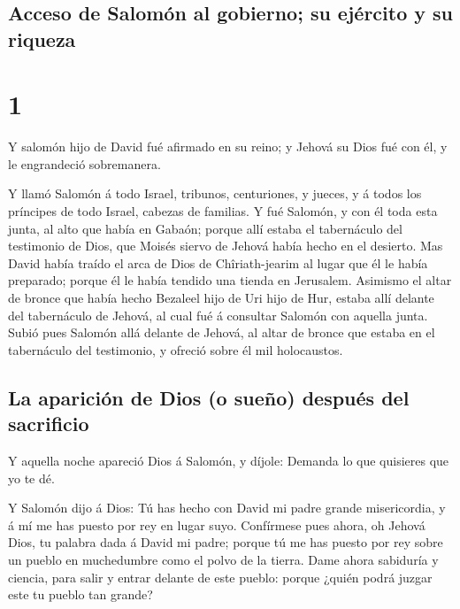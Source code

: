 \hypertarget{acceso-de-salomuxf3n-al-gobierno-su-ejuxe9rcito-y-su-riqueza}{%
\subsection{Acceso de Salomón al gobierno; su ejército y su
riqueza}\label{acceso-de-salomuxf3n-al-gobierno-su-ejuxe9rcito-y-su-riqueza}}

\hypertarget{section}{%
\section{1}\label{section}}

 Y salomón hijo de David fué afirmado en su reino; y Jehová
su Dios fué con él, y le engrandeció sobremanera.

 Y llamó Salomón á todo Israel, tribunos, centuriones, y
jueces, y á todos los príncipes de todo Israel, cabezas de familias.
 Y fué Salomón, y con él toda esta junta, al alto que había
en Gabaón; porque allí estaba el tabernáculo del testimonio de Dios, que
Moisés siervo de Jehová había hecho en el desierto.  Mas
David había traído el arca de Dios de Chîriath-jearim al lugar que él le
había preparado; porque él le había tendido una tienda en Jerusalem.
 Asimismo el altar de bronce que había hecho Bezaleel hijo
de Uri hijo de Hur, estaba allí delante del tabernáculo de Jehová, al
cual fué á consultar Salomón con aquella junta.  Subió pues
Salomón allá delante de Jehová, al altar de bronce que estaba en el
tabernáculo del testimonio, y ofreció sobre él mil holocaustos.

\hypertarget{la-apariciuxf3n-de-dios-o-sueuxf1o-despuuxe9s-del-sacrificio}{%
\subsection{La aparición de Dios (o sueño) después del
sacrificio}\label{la-apariciuxf3n-de-dios-o-sueuxf1o-despuuxe9s-del-sacrificio}}

 Y aquella noche apareció Dios á Salomón, y díjole: Demanda
lo que quisieres que yo te dé.

 Y Salomón dijo á Dios: Tú has hecho con David mi padre
grande misericordia, y á mí me has puesto por rey en lugar suyo.
 Confírmese pues ahora, oh Jehová Dios, tu palabra dada á
David mi padre; porque tú me has puesto por rey sobre un pueblo en
muchedumbre como el polvo de la tierra.  Dame ahora
sabiduría y ciencia, para salir y entrar delante de este pueblo: porque
¿quién podrá juzgar este tu pueblo tan grande?

